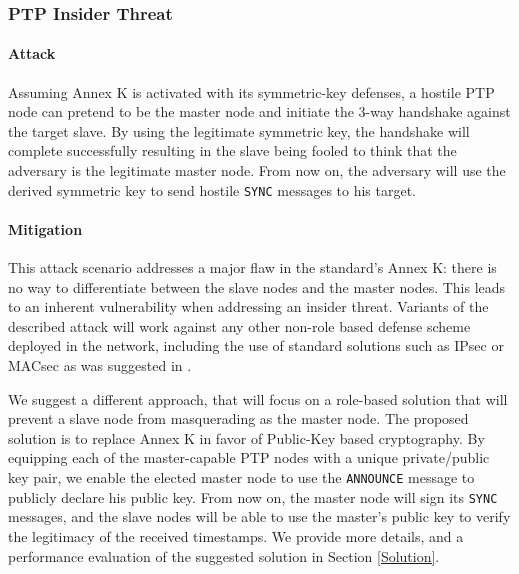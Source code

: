 \documentclass[11pt]{article}
\begin{document}
\subsubsection{PTP Insider Threat}\label{time:scenrio6}

\paragraph{Attack}

Assuming Annex K is activated with its symmetric-key defenses, a hostile PTP node can pretend to be the master node and initiate the 3-way handshake against the target slave. By using the legitimate symmetric key, the handshake will complete successfully resulting in the slave being fooled to think that the adversary is the legitimate master node. From now on, the adversary will use the derived symmetric key to send hostile \texttt{SYNC} messages to his target.



\paragraph{Mitigation}\label{time:scenrio6mit}

This attack scenario addresses a major flaw in the standard's Annex K: there is no way to differentiate between the slave nodes and the master nodes. This leads to an inherent vulnerability when addressing an insider threat. Variants of the described attack will work against any other non-role based defense scheme deployed in the network, including the use of standard solutions such as IPsec or MACsec as was suggested in \cite{ISPCS_2012}.



We suggest a different approach, that will focus on a role-based solution that will prevent a slave node from masquerading as the master node. The proposed solution is to replace Annex K in favor of Public-Key based cryptography. By equipping each of the master-capable PTP nodes with a unique private/public key pair, we enable the elected master node to use the \texttt{ANNOUNCE} message to publicly declare his public key. From now on, the master node will sign its \texttt{SYNC} messages, and the slave nodes will be able to use the master's public key to verify the legitimacy of the received timestamps. We provide more details, and a performance evaluation of the suggested solution in Section \ref{Solution}.
\end{document}
